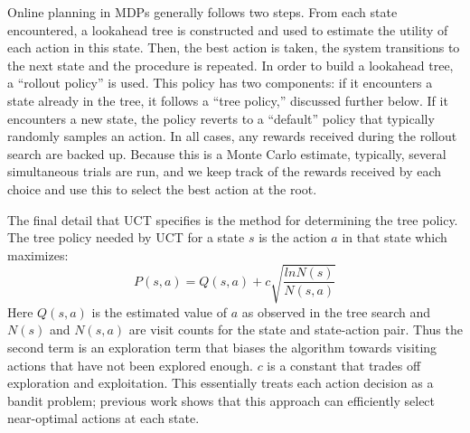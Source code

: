 Online planning in MDPs generally follows two steps. From each state
encountered, a lookahead tree is constructed and used to estimate the
utility of each action in this state. Then, the best action is taken,
the system transitions to the next state and the procedure is
repeated. In order to build a lookahead tree, a ``rollout policy'' is
used. This policy has two components: if it encounters a state already
in the tree, it follows a ``tree policy,'' discussed further below. If
it encounters a new state, the policy reverts to a ``default'' policy
that typically randomly samples an action. In all cases, any rewards
received during the rollout search are backed up. Because this is a
Monte Carlo estimate, typically, several simultaneous trials are run,
and we keep track of the rewards received by each choice and
use this to select the best action at the root.

The final detail that UCT specifies is the method for determining the tree policy.
The tree policy needed by UCT for a state $s$ is the action $a$ in that state which maximizes:
\begin{equation}
P(s,a) = Q(s,a) + c\sqrt{\frac{ln N(s)}{N(s,a)}}\label{eqn:uct}
\end{equation}
Here $Q(s,a)$ is the estimated value of $a$ as observed in the tree
search and $N(s)$ and $N(s,a)$ are visit counts for the state and
state-action pair. Thus the second term is an exploration term that
biases the algorithm towards visiting actions that have not been
explored enough. $c$ is a constant that trades off exploration and
exploitation. This essentially treats each action decision
as a bandit problem; previous work shows that this approach can
efficiently select near-optimal actions at each state.

